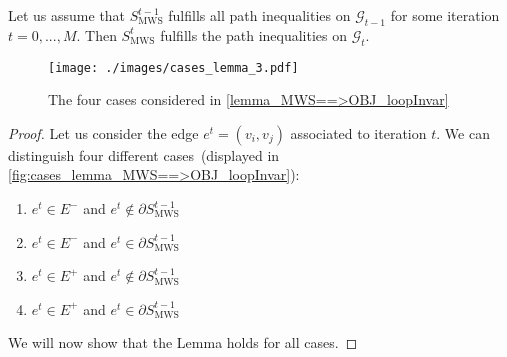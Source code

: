 \begin{lemma}
\label{lemma_MWS==>OBJ_loopInvar}Let us assume that $S_{\mathrm{MWS}}^{t-1}$
fulfills all path inequalities on $\mathcal{G}_{t-1}$ for some iteration
$t=0,...,M$. Then $S_{\mathrm{MWS}}^{t}$ fulfills the path inequalities
on $\mathcal{G}_{t}$. 
\end{lemma}

\begin{figure}[t]
\centering
\texttt{[image: ./images/cases\_lemma\_3.pdf]}
   \caption{The four cases considered in \autoref{lemma_MWS==>OBJ_loopInvar}}
   \label{fig:cases_lemma_MWS==>OBJ_loopInvar}
\end{figure}


\begin{proof}
Let us consider the edge $e^{t}=(v_{i},v_{j})$ associated to iteration $t$. We can distinguish four different cases~(displayed in \autoref{fig:cases_lemma_MWS==>OBJ_loopInvar}):

\begin{minipage}{.5\textwidth}
\begin{enumerate}
\item $e^{t}\in E^{-}$ and $e^{t}\notin\partial S_{\mathrm{MWS}}^{t-1}$
\item $e^{t}\in E^{-}$ and $e^{t}\in\partial S_{\mathrm{MWS}}^{t-1}$
\end{enumerate}
\end{minipage}
\begin{minipage}{.5\textwidth}
\begin{enumerate}
 \setcounter{enumi}{2}
\item $e^{t}\in E^{+}$ and $e^{t}\notin\partial S_{\mathrm{MWS}}^{t-1}$
\item $e^{t}\in E^{+}$ and $e^{t}\in\partial S_{\mathrm{MWS}}^{t-1}$
\end{enumerate}

\end{minipage}
We will now show that the Lemma holds for all cases. %


\end{proof}
